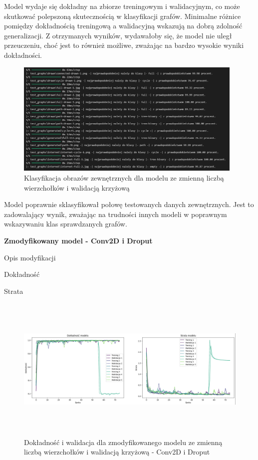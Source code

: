 Model wydaje się dokładny na zbiorze treningowym i walidacyjnym,
co może skutkować polepszoną skutecznością w klasyfikacji grafów.
Minimalne różnice pomiędzy dokładnością treningową a walidacyjną wskazują na dobrą zdolność generalizacji.
Z otrzymanych wyników, wydawałoby się, że model nie uległ przeuczeniu,
choć jest to również możliwe, zważając na bardzo wysokie wyniki dokładności. 

\begin{figure}[ht]
	\centering
	\includegraphics[height=5.5cm]{resources/tests/images/v3/multiple_edges_crossvalid_txt.png}
	\caption{Klasyfikacja obrazów zewnętrznych dla modelu ze zmienną liczbą wierzchołków i walidacją krzyżową}
	\label{Fig:tests-csvar-2}
\end{figure}
\FloatBarrier

Model poprawnie sklasyfikował połowę testowanych danych zewnętrznych.
Jest to zadowalający wynik, zważając na trudności innych modeli w poprawnym wskazywaniu klas sprawdzanych grafów.

\textbf{Zmodyfikowany model - Conv2D i Droput}

Opis modyfikacji %

Dokładność %

Strata %

\begin{figure}[ht]
	\centering
	\includegraphics[height=7cm]{resources/tests/images/v4/multiple_edges_crossvalid_1_img.png}
	\caption{Dokładność i walidacja dla zmodyfikowanego modelu ze zmienną liczbą wierzchołków i walidacją krzyżową - Conv2D i Droput}
	\label{Fig:tests-var-2}
\end{figure}
\FloatBarrier

